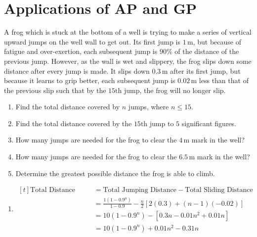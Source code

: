\documentclass[11pt,a4paper]{book}
\begin{document}
\newpage

\section{Applications of AP and GP}

\begin{example}

A frog which is stuck at the bottom of a well is trying to make a
series of vertical upward jumps on the well wall to get out. Its first
jump is $1\,\text{m}$, but because of fatigue and over-exertion,
each subsequent jump is $90\%$ of the distance of the previous jump. However, as the wall is wet and slippery, the frog slips down some distance after every jump is made. It slips down $0.3\,\text{m}$ after its first jump, but because it learns to grip better, each subsequent jump is $0.02\,\text{m}$ less than that of the previous slip such that by the $15\text{th}$ jump, the frog will no longer slip. 

\begin{enumerate}[label=(\alph*)]

\item  Find the total distance covered by $n$ jumps, where $n\leq15$.

\item  Find the total distance covered by the $15\text{th}$ jump
to $5$ significant figures.

\item  How many jumps are needed for the frog to clear the $4\,\text{m}$ mark in the well?

\item  How many jumps are needed for the frog to clear the $6.5\,\text{m}$ mark in the well?

\item  Determine the greatest possible distance the frog is able
to climb.

\end{enumerate}

\Solution

\begin{enumerate}[label=(\alph*)]

\item  
$
\begin{aligned}[t]
\text{Total Distance Covered} & =\text{Total Jumping Distance}-\text{Total Sliding Distance}\\
 & =\frac{1\left(1-0.9^{n}\right)}{1-0.9}-\frac{n}{2}\left[2\left(0.3\right)+\left(n-1\right)\left(-0.02\right)\right]\\
 & =10\left(1-0.9^{n}\right)-\left[0.3n-0.01n^{2}+0.01n\right]\\
 & =10\left(1-0.9^{n}\right)+0.01n^{2}-0.31n
\end{aligned}
$


\end{enumerate}
\end{example}
\end{document}
